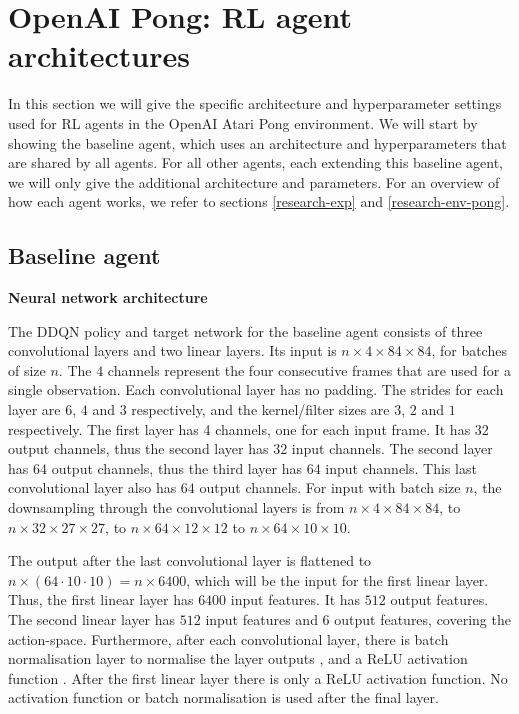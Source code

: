 \section{OpenAI Pong: RL agent architectures}\label{appendix-agents-pong}
In this section we will give the specific architecture and hyperparameter settings used for RL agents in the OpenAI Atari Pong environment. We will start by showing the baseline agent, which uses an architecture and hyperparameters that are shared by all agents. For all other agents, each extending this baseline agent, we will only give the additional architecture and parameters. For an overview of how each agent works, we refer to sections \ref{research-exp} and \ref{research-env-pong}.


\subsection{Baseline agent}\label{appendix-baseline-pong}
\textbf{Neural network architecture}\par
\noindent The DDQN policy and target network for the baseline agent consists of three convolutional layers and two linear layers. Its input is $n \times 4 \times 84 \times 84$, for batches of size $n$. The $4$ channels represent the four consecutive frames that are used for a single observation. Each convolutional layer has no padding. The strides for each layer are $6$, $4$ and $3$ respectively, and the kernel/filter sizes are $3$, $2$ and $1$ respectively. The first layer has 4 channels, one for each input frame. It has $32$ output channels, thus the second layer has $32$ input channels. The second layer has $64$ output channels, thus the third layer has $64$ input channels. This last convolutional layer also has $64$ output channels. For input with batch size $n$, the downsampling through the convolutional layers is from $n \times 4 \times 84 \times 84$, to $n \times 32 \times 27 \times 27$, to $n \times 64 \times 12 \times 12$ to $n \times 64 \times 10 \times 10$. 

The output after the last convolutional layer is flattened to $n \times (64 \cdot 10 \cdot 10) = n \times 6400$, which will be the input for the first linear layer. Thus, the first linear layer has $6400$ input features. It has $512$ output features. The second linear layer has $512$ input features and $6$ output features, covering the action-space. Furthermore, after each convolutional layer, there is batch normalisation layer to normalise the layer outputs \cite{batchnorm}, and a ReLU activation function \cite{relu}. After the first linear layer there is only a ReLU activation function. No activation function or batch normalisation is used after the final layer.

